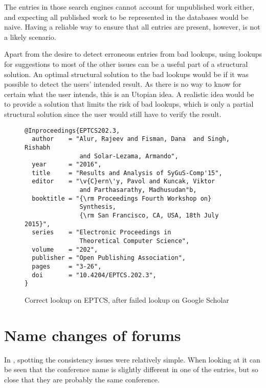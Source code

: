 The entries in those search engines cannot account for unpublished
work either, and expecting all published work to be represented in the
databases would be naive.  Having a reliable way to ensure that all
entries are present, however, is not a likely scenario.

Apart from the desire to detect erroneous entries from bad lookups,
using lookups for suggestions to most of the other issues can be a
useful part of a structural solution.  An optimal structural solution
to the bad lookups would be if it was possible to detect the users'
intended result.  As there is no way to know for certain what the user
intends, this is an Utopian idea.  A realistic idea would be to
provide a solution that limits the risk of bad lookups, which is only
a partial structural solution since the user would still have to
verify the result.

\begin{figure}
  \centering
\begin{small}
\begin{verbatim}
@Inproceedings{EPTCS202.3,
  author    = "Alur, Rajeev and Fisman, Dana  and Singh, Rishabh
               and Solar-Lezama, Armando",
  year      = "2016",
  title     = "Results and Analysis of SyGuS-Comp'15",
  editor    = "\v{C}ern\'y, Pavol and Kuncak, Viktor
               and Parthasarathy, Madhusudan"b,
  booktitle = "{\rm Proceedings Fourth Workshop on}
               Synthesis,
               {\rm San Francisco, CA, USA, 18th July 2015}",
  series    = "Electronic Proceedings in
               Theoretical Computer Science",
  volume    = "202",
  publisher = "Open Publishing Association",
  pages     = "3-26",
  doi       = "10.4204/EPTCS.202.3",
}
\end{verbatim}
\end{small}
  \caption{Correct lookup on EPTCS, after failed lookup on Google Scholar}
\label{fig:eptcs_lookup}
\end{figure}


\section{Name changes of forums}
\label{sec:problems_name_changes}

In , spotting the consistency
issues were relatively simple.  When looking at
 it can be seen that the
conference name is slightly different in one of the entries, but so
close that they are probably the same conference.

